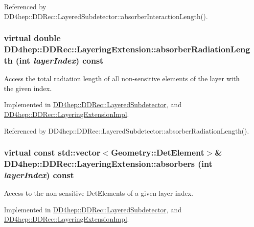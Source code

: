 Referenced by DD4hep::DDRec::LayeredSubdetector::absorberInteractionLength().\hypertarget{class_d_d4hep_1_1_d_d_rec_1_1_layering_extension_aca33441136624022aa7414895ba81fef}{
\subsubsection[{absorberRadiationLength}]{\setlength{\rightskip}{0pt plus 5cm}virtual double DD4hep::DDRec::LayeringExtension::absorberRadiationLength (int {\em layerIndex}) const}}
\label{class_d_d4hep_1_1_d_d_rec_1_1_layering_extension_aca33441136624022aa7414895ba81fef}


Access the total radiation length of all non-\/sensitive elements of the layer with the given index. 

Implemented in \hyperlink{class_d_d4hep_1_1_d_d_rec_1_1_layered_subdetector_a839b11ff32fe856b842cf26729cdb655}{DD4hep::DDRec::LayeredSubdetector}, and \hyperlink{class_d_d4hep_1_1_d_d_rec_1_1_layering_extension_impl_ac2322db259f10e8e7ff13878c5273fb0}{DD4hep::DDRec::LayeringExtensionImpl}.

Referenced by DD4hep::DDRec::LayeredSubdetector::absorberRadiationLength().\hypertarget{class_d_d4hep_1_1_d_d_rec_1_1_layering_extension_a1204ac80c52fbca9ce3f71e2b3662eab}{
\subsubsection[{absorbers}]{\setlength{\rightskip}{0pt plus 5cm}virtual const std::vector$<${\bf Geometry::DetElement}$>$\& DD4hep::DDRec::LayeringExtension::absorbers (int {\em layerIndex}) const}}
\label{class_d_d4hep_1_1_d_d_rec_1_1_layering_extension_a1204ac80c52fbca9ce3f71e2b3662eab}


Access to the non-\/sensitive DetElements of a given layer index. 

Implemented in \hyperlink{class_d_d4hep_1_1_d_d_rec_1_1_layered_subdetector_a5359b752b8f6105c65fbe3e65044fdcb}{DD4hep::DDRec::LayeredSubdetector}, and \hyperlink{class_d_d4hep_1_1_d_d_rec_1_1_layering_extension_impl_ab7007d1f2250d46b4fe6ad14213c40dd}{DD4hep::DDRec::LayeringExtensionImpl}.

